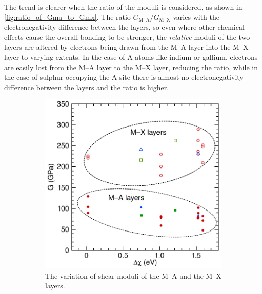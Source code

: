 The trend is clearer when the ratio of the moduli is considered, as shown in \autoref{fig:ratio_of_Gma_to_Gmx}. The ratio $G_{\text{M--A}}/G_{\text{M--X}}$ varies with the electronegativity difference between the layers, so even where other chemical effects cause the overall bonding to be stronger, the \emph{relative} moduli of the two layers are altered by electrons being drawn from the M--A layer into the M--X layer to varying extents. In the case of A atoms like indium or gallium, electrons are easily lost from the M--A layer to the M--X layer, reducing the ratio, while in the case of sulphur occupying the A site there is almost no electronegativity difference between the layers and the ratio is higher.


\begin{figure}
\centering

\begin{subfigure}{0.4\textwidth}
\centering
{}
\includegraphics[width=\textwidth]{Gmx_and_Gma_dX_MAX}
\caption{The variation of shear moduli of the M--A and the M--X layers.  \label{fig:Gma_variation}}
\end{subfigure}
~
\begin{subfigure}{0.4\textwidth}
\centering
{}

\end{subfigure}
\end{figure}
